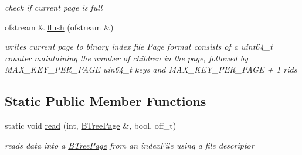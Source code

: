 \begin{DoxyCompactItemize}
\begin{DoxyCompactList}\small\item\em check if current page is full \end{DoxyCompactList}\item 
ofstream \& \hyperlink{class_b_tree_page_afaceefe62feb4d475328616b4c2b8142}{flush} (ofstream \&)
\begin{DoxyCompactList}\small\item\em writes current page to binary index file Page format consists of a uint64\+\_\+t counter maintaining the number of children in the page, followed by M\+A\+X\+\_\+\+K\+E\+Y\+\_\+\+P\+E\+R\+\_\+\+P\+A\+G\+E uin64\+\_\+t keys and M\+A\+X\+\_\+\+K\+E\+Y\+\_\+\+P\+E\+R\+\_\+\+P\+A\+G\+E + 1 rids \end{DoxyCompactList}\end{DoxyCompactItemize}
\subsection*{Static Public Member Functions}
\begin{DoxyCompactItemize}
\item 
static void \hyperlink{class_b_tree_page_a6505accec8fefbec85a2b7bcba8b53ef}{read} (int, \hyperlink{class_b_tree_page}{B\+Tree\+Page} \&, bool, off\+\_\+t)
\begin{DoxyCompactList}\small\item\em reads data into a \hyperlink{class_b_tree_page}{B\+Tree\+Page} from an index\+File using a file descriptor \end{DoxyCompactList}\end{DoxyCompactItemize}
